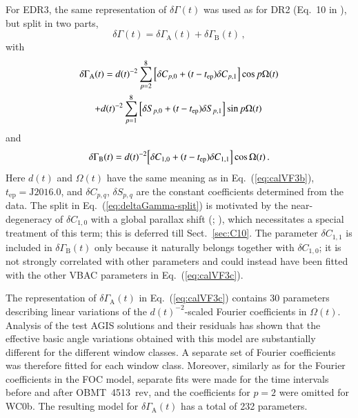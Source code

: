 \documentclass[longauth]{aa} %
\begin{document}
For EDR3, the same representation of $\delta\Gamma(t)$ was 
used as for DR2 (Eq.~10 in ), but split in two parts, 
\begin{equation}\label{eq:deltaGamma-split}
\delta\Gamma(t)=\delta\Gamma_\text{A}(t)+\delta\Gamma_\text{B}(t)\,,
\end{equation}
with
\begin{multline}\label{eq:calVF3c}
\delta\Gamma_\text{A}(t) = d(t)^{-2} 
\sum_{p=2}^8\, \Bigl[\delta C_{p,0}+(t-t_\text{ep})\delta C_{p,1}\Bigr]\cos p\Omega(t) \\
+ d(t)^{-2} 
\sum_{p=1}^8\, \Bigl[\delta S_{p,0}+(t-t_\text{ep})\delta S_{p,1}\Bigr]\sin p\Omega(t) \,  
\end{multline}
and
\begin{equation}\label{eq:deltaGamma-C10}
\delta\Gamma_\text{B}(t) = d(t)^{-2} \Bigl[\delta C_{1,0}+(t-t_\text{ep})\delta C_{1,1}\Bigr]\cos\Omega(t)\,.
\end{equation}
Here $d(t)$ and $\Omega(t)$ have the same meaning as in Eq.~(\ref{eq:calVF3b}),
$t_\text{ep}=\text{J}2016.0$, and $\delta C_{p,q}$, $\delta S_{p,q}$ are the constant 
coefficients determined from the data. The split in Eq.~(\ref{eq:deltaGamma-split}) 
is motivated by the near-degeneracy of $\delta C_{1,0}$ with a global parallax shift
(; ),
which necessitates a special treatment of this term; this is deferred till Sect.~\ref{sec:C10}.
The parameter $\delta C_{1,1}$ is included in $\delta\Gamma_\text{B}(t)$ only because it
naturally belongs together with $\delta C_{1,0}$; it is not strongly correlated with other
parameters and could instead have been fitted with the other VBAC parameters in 
Eq.~(\ref{eq:calVF3c}).

The representation of $\delta\Gamma_\text{A}(t)$ in
Eq.~(\ref{eq:calVF3c}) contains 30 parameters describing linear
variations of the $d(t)^{-2}$-scaled Fourier coefficients in
$\Omega(t)$. Analysis of the test AGIS solutions and their residuals has shown
that the effective basic angle variations obtained with this model are substantially 
different for the different window classes. A separate set of Fourier coefficients was
therefore fitted for each window class.
Moreover, similarly as for the Fourier coefficients
in the FOC model, separate fits were made for the time intervals before and after 
OBMT~4513~rev, and the coefficients for $p=2$ were omitted for WC0b.
The resulting model for $\delta\Gamma_\text{A}(t)$ has a total of 232 parameters.
\end{document}
